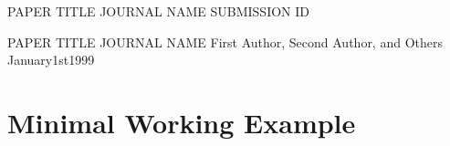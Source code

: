 \documentclass{article}
\begin{document}
\begin{anonymous_cover_letter}
    {PAPER TITLE}
    {JOURNAL NAME}
    {SUBMISSION ID}

\end{anonymous_cover_letter}

\begin{cover_letter}
    {PAPER TITLE}
    {JOURNAL NAME}
    {First Author, Second Author, and Others}
    {January}{1st}{1999}

\end{cover_letter}

\section{Minimal Working Example}

\todo{} \fixgrammar{\lipsum[2][1]} \revision{\lipsum[2][2]} \addition{\lipsum[2][3]} \todotext{\lipsum[2][4]} \lipsum[2][5]


\begin{reviewer_comment}
\lipsum[1]
\end{reviewer_comment}

\begin{author_response}
\lipsum[2]
\end{author_response}
\end{document}
